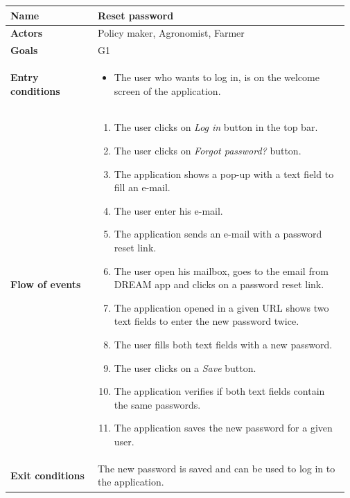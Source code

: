 \begin{table}[H]
    \centering
	\begin{tabular}{@{}p{0.25\linewidth} p{0.72\linewidth}@{}}
\toprule
		\textbf{Name}               & Reset password\\
		\midrule
		\textbf{Actors}             & Policy maker, Agronomist, Farmer\\
		\midrule
		\textbf{Goals}              & G1 \\
		\midrule
		
		\textbf{Entry conditions}   & \begin{itemize}[leftmargin=.4cm,noitemsep,topsep=0pt,before=\vspace{-3mm},after=\vspace{-4mm}]
		    \item The user who wants to log in, is on the welcome screen of the application.
		\end{itemize}\\
		\midrule
		
		\textbf{Flow of events}     & \begin{enumerate}[leftmargin=.4cm,noitemsep,topsep=0pt,before=\vspace{-3mm},after=\vspace{-4mm}]
		    \item The user clicks on \textit{Log in} button in the top bar.
		    \item The user clicks on \textit{Forgot password?} button.
		    \item The application shows a pop-up with a text field to fill an e-mail.
		    \item The user enter his e-mail.
		    \item The application sends an e-mail with a password reset link.
		    \item The user open his mailbox, goes to the email from DREAM app and clicks on a password reset link.
		    \item The application opened in a given URL shows two text fields to enter the new password twice.
		    \item The user fills both text fields with a new password.
		    \item The user clicks on a \textit{Save} button.
		    \item The application verifies if both text fields contain the same passwords.
		    \item The application saves the new password for a given user.
		\end{enumerate}\\
		\midrule
		\textbf{Exit conditions}    & The new password is saved and can be used to log in to the application.
		\\ \midrule
		

\end{tabular}
\end{table}
